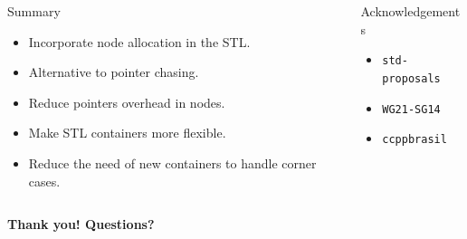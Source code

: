 \documentclass[10pt,aspectratio=169]{beamer}
\begin{document}
\begin{frame}[fragile]
{}
{}

\begin{columns}
\begin{column}{0.47\textwidth}
\begin{block}{Summary}
\begin{itemize}
\item Incorporate node allocation in the STL.
\item Alternative to pointer chasing.
\item Reduce pointers overhead in nodes.
\item Make STL containers more flexible.
\item Reduce the need of new containers to handle corner cases.
\end{itemize}
\end{block}
\end{column}
\begin{column}{0.47\textwidth}
\begin{block}{Acknowledgements}
\begin{itemize}
\item \texttt{std-proposals}
\item \texttt{WG21-SG14}
\item \texttt{ccppbrasil}
\end{itemize}
\end{block}
\end{column}
\end{columns}

\end{frame}

\begin{frame}{}
    \vspace{1cm}
    \begin{center}
        {\Large \bf Thank you! Questions?} 
    \end{center}
\end{frame}
\end{document}
